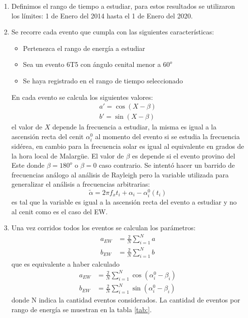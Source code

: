 \begin{enumerate}
    \item Definimos el rango de tiempo a estudiar, para estos resultados se utilizaron los límites: 1 de Enero del 2014 hasta el 1 de Enero del 2020.
    \item Se recorre cada evento que cumpla con las siguientes características:
     \begin{itemize}
        \item Pertenezca el rango de energía a estudiar
        \item Sea un evento 6T5 con ángulo cenital menor a $60^o$
        \item Se haya registrado en el rango de tiempo seleccionado
    \end{itemize}
    En cada evento se calcula los siguientes valores:
    \begin{align}
        a' = \cos(X - \beta)\\
        b' = \sin(X - \beta)
    \end{align}
    el valor de $X$ depende la frecuencia a estudiar, la misma es igual a la ascensión recta del cenit $\alpha^0_i$ al momento del evento  si se estudia la frecuencia sidérea, en cambio para la frecuencia solar es igual al equivalente en grados de la hora local de Malargüe. El valor de $\beta$ es depende si el evento provino del Este donde $\beta=180^o$ o $\beta=0$ caso contrario.
    Se intentó hacer un barrido de frecuencias análogo al análisis de Rayleigh pero la variable utilizada para generalizar el análisis a frecuencias arbitrarias:
    \begin{equation}
        \tilde{\alpha} = 2\pi f_x t_i + \alpha_i - \alpha_i^0(t_i) \label{ra_mod}
      \end{equation}
    es tal que la variable es igual a la ascensión recta del evento a estudiar y no al cenit como es el caso del EW.
    \item Una vez corridos todos los  eventos se calculan los parámetros:
    \begin{align*}
        a_{EW} &= \frac{2}{N} \sum^N_{i=1} a\\
        b_{EW} &= \frac{2}{N} \sum^N_{i=1} b
    \end{align*}
    que es equivalente a haber calculado
    \begin{align*}
        a_{EW} &= \frac{2}{N} \sum^N_{i=1} \cos(\alpha^0_i - \beta_i)\\
        b_{EW} &= \frac{2}{N} \sum^N_{i=1} \sin(\alpha^0_i - \beta_i)
    \end{align*}
    donde N indica la cantidad eventos considerados. La cantidad de eventos por rango de energía se muestran en la tabla \ref{tab:}.


\end{enumerate}
